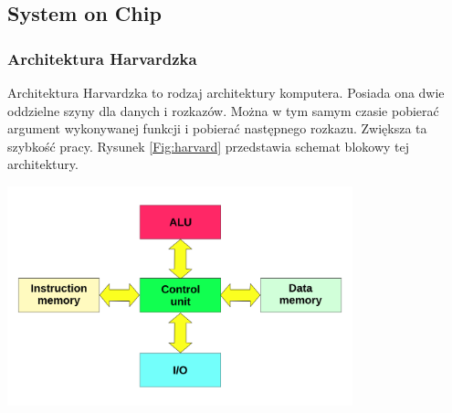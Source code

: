 \documentclass[11pt,a4paper]{article}
\begin{document}
	\subsection{System on Chip}

		\subsubsection{Architektura Harvardzka}
		\hspace{5mm}
			Architektura Harvardzka to rodzaj architektury komputera. Posiada ona dwie oddzielne szyny dla danych i rozkazów. Można w tym samym czasie pobierać argument wykonywanej funkcji i pobierać następnego rozkazu. Zwiększa ta szybkość pracy. Rysunek \ref{Fig:harvard} przedstawia schemat blokowy tej architektury.\\
\begin{samepage}
\nopagebreak
\begin{center}
		\includegraphics[width=10cm]{./rysunki/Harvard_architecture.png}
		\end{center}
\end{samepage}
\end{document}
